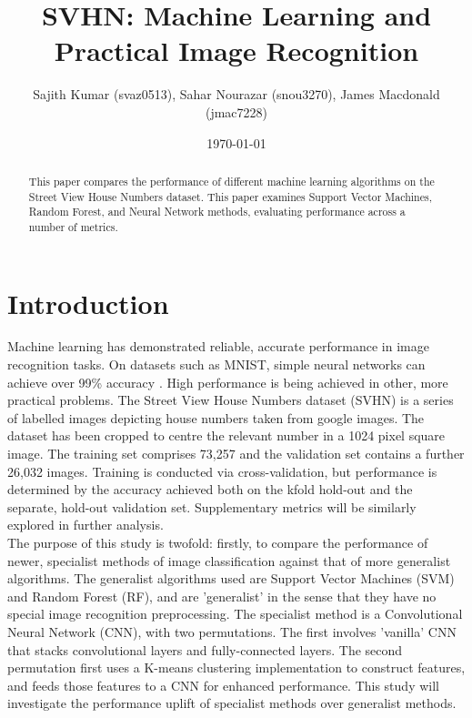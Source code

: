 \documentclass[12pt]{article}
\title{SVHN: Machine Learning and Practical Image Recognition}
\author{Sajith Kumar (svaz0513), Sahar Nourazar (snou3270), James Macdonald (jmac7228)}
\date{\today}
\begin{document}
\maketitle
\thispagestyle{empty}

\begin{abstract}
This paper compares the performance of different machine learning algorithms on the Street View House Numbers dataset. This paper examines Support Vector Machines, Random Forest, and Neural Network methods, evaluating performance across a number of metrics.
\end{abstract}

\section{Introduction}
 
Machine learning has demonstrated reliable, accurate performance in image recognition tasks. On datasets such as MNIST, simple neural networks can achieve over 99\% accuracy \citep{tfmnist}. High performance is being achieved in other, more practical problems. The Street View House Numbers dataset (SVHN) is a series of labelled images depicting house numbers taken from google images. The dataset has been cropped to centre the relevant number in a 1024 pixel square image. The training set comprises 73,257 and the validation set contains a further 26,032 images. Training is conducted via cross-validation, but performance is determined by the accuracy achieved both on the kfold hold-out and the separate, hold-out validation set. Supplementary metrics will be similarly explored in further analysis.\\

The purpose of this study is twofold: firstly, to compare the performance of newer, specialist methods of image classification against that of more generalist algorithms. The generalist algorithms used are Support Vector Machines (SVM) and Random Forest (RF), and are 'generalist' in the sense that they have no special image recognition preprocessing. The specialist method is a Convolutional Neural Network (CNN), with two permutations. The first involves 'vanilla' CNN that stacks convolutional layers and fully-connected layers. The second permutation first uses a K-means clustering implementation to construct features, and feeds those features to a CNN for enhanced performance. This study will investigate the performance uplift of specialist methods over generalist methods.\\
\end{document}
